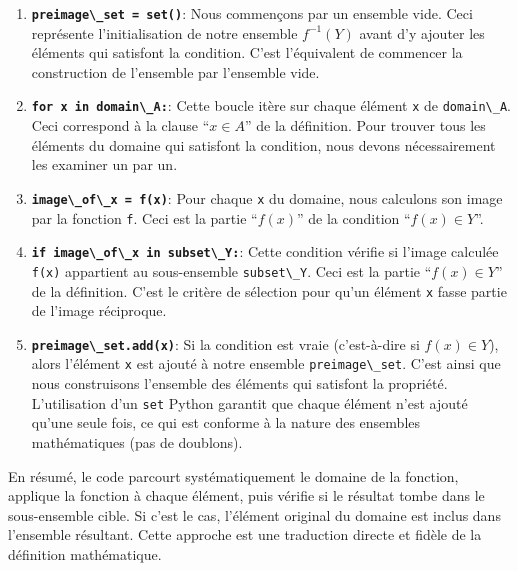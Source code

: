 \documentclass[12pt,a4paper]{report}
\newcommand{\passthrough}[1]{#1}
\begin{document}
\begin{enumerate}
\def\labelenumi{\arabic{enumi}.}
\item
  \textbf{\passthrough{\lstinline!preimage\_set = set()!}}: Nous
  commençons par un ensemble vide. Ceci représente l'initialisation de
  notre ensemble \(f^{-1}(Y)\) avant d'y ajouter les éléments qui
  satisfont la condition. C'est l'équivalent de commencer la
  construction de l'ensemble par l'ensemble vide.
\item
  \textbf{\passthrough{\lstinline!for x in domain\_A:!}}: Cette boucle
  itère sur chaque élément \passthrough{\lstinline!x!} de
  \passthrough{\lstinline!domain\_A!}. Ceci correspond à la clause
  ``\(x \in A\)'' de la définition. Pour trouver tous les éléments du
  domaine qui satisfont la condition, nous devons nécessairement les
  examiner un par un.
\item
  \textbf{\passthrough{\lstinline!image\_of\_x = f(x)!}}: Pour chaque
  \passthrough{\lstinline!x!} du domaine, nous calculons son image par
  la fonction \passthrough{\lstinline!f!}. Ceci est la partie
  ``\(f(x)\)'' de la condition ``\(f(x) \in Y\)''.
\item
  \textbf{\passthrough{\lstinline!if image\_of\_x in subset\_Y:!}}:
  Cette condition vérifie si l'image calculée
  \passthrough{\lstinline!f(x)!} appartient au sous-ensemble
  \passthrough{\lstinline!subset\_Y!}. Ceci est la partie
  ``\(f(x) \in Y\)'' de la définition. C'est le critère de sélection
  pour qu'un élément \passthrough{\lstinline!x!} fasse partie de l'image
  réciproque.
\item
  \textbf{\passthrough{\lstinline!preimage\_set.add(x)!}}: Si la
  condition est vraie (c'est-à-dire si \(f(x) \in Y\)), alors l'élément
  \passthrough{\lstinline!x!} est ajouté à notre ensemble
  \passthrough{\lstinline!preimage\_set!}. C'est ainsi que nous
  construisons l'ensemble des éléments qui satisfont la propriété.
  L'utilisation d'un \passthrough{\lstinline!set!} Python garantit que
  chaque élément n'est ajouté qu'une seule fois, ce qui est conforme à
  la nature des ensembles mathématiques (pas de doublons).
\end{enumerate}

En résumé, le code parcourt systématiquement le domaine de la fonction,
applique la fonction à chaque élément, puis vérifie si le résultat tombe
dans le sous-ensemble cible. Si c'est le cas, l'élément original du
domaine est inclus dans l'ensemble résultant. Cette approche est une
traduction directe et fidèle de la définition mathématique.
\end{document}
